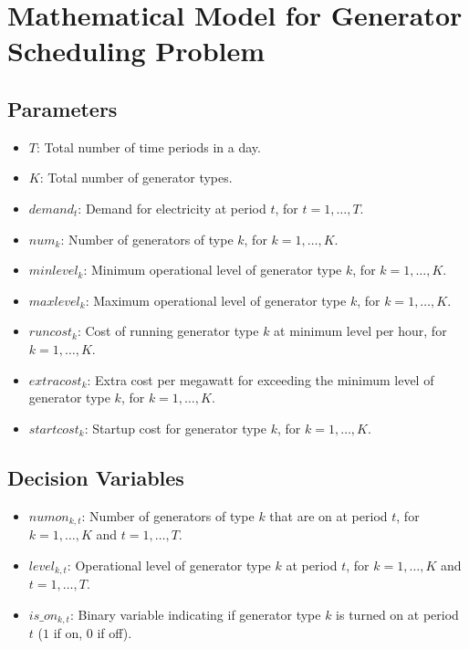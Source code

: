 \documentclass{article}
\begin{document}
\section*{Mathematical Model for Generator Scheduling Problem}

\subsection*{Parameters}

\begin{itemize}
    \item $T$: Total number of time periods in a day.
    \item $K$: Total number of generator types.
    \item $demand_{t}$: Demand for electricity at period $t$, for $t = 1,\ldots,T$.
    \item $num_{k}$: Number of generators of type $k$, for $k = 1,\ldots,K$.
    \item $minlevel_{k}$: Minimum operational level of generator type $k$, for $k = 1,\ldots,K$.
    \item $maxlevel_{k}$: Maximum operational level of generator type $k$, for $k = 1,\ldots,K$.
    \item $runcost_{k}$: Cost of running generator type $k$ at minimum level per hour, for $k = 1,\ldots,K$.
    \item $extracost_{k}$: Extra cost per megawatt for exceeding the minimum level of generator type $k$, for $k = 1,\ldots,K$.
    \item $startcost_{k}$: Startup cost for generator type $k$, for $k = 1,\ldots,K$.
\end{itemize}

\subsection*{Decision Variables}

\begin{itemize}
    \item $numon_{k,t}$: Number of generators of type $k$ that are on at period $t$, for $k = 1,\ldots,K$ and $t = 1,\ldots,T$.
    \item $level_{k,t}$: Operational level of generator type $k$ at period $t$, for $k = 1,\ldots,K$ and $t = 1,\ldots,T$.
    \item $is\_on_{k,t}$: Binary variable indicating if generator type $k$ is turned on at period $t$ ($1$ if on, $0$ if off).
\end{itemize}
\end{document}
